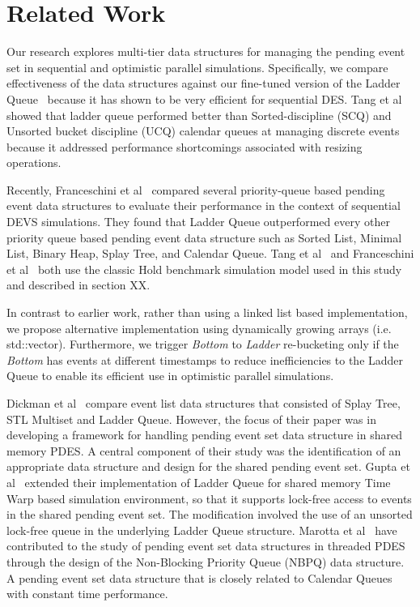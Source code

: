 \section{Related Work}
Our research explores multi-tier data structures for managing the pending event set in sequential and optimistic parallel simulations. Specifically, we compare effectiveness of the data structures against our fine-tuned version of the Ladder Queue~\cite{tang-05} because it has shown to be very efficient for sequential DES. Tang et al~\cite{tang-05} showed that ladder queue performed better than Sorted-discipline (SCQ) and Unsorted bucket discipline (UCQ) calendar queues at managing discrete events because it addressed performance shortcomings associated with resizing operations.  

Recently, Franceschini et al~\cite{franceschini-15} compared several priority-queue based pending event data structures to evaluate their performance in the context of sequential DEVS simulations. They found that Ladder Queue outperformed every other priority queue based pending event data structure such as Sorted List, Minimal List, Binary Heap, Splay Tree, and Calendar Queue. Tang et al~\cite{tang-05} and Franceschini et al~\cite{franceschini-15} both use the classic Hold benchmark simulation model used in this study and described in section XX.

In contrast to earlier work, rather than using a linked list based implementation, we propose alternative implementation using dynamically growing arrays (i.e. std::vector). Furthermore, we trigger \textit{Bottom} to \textit{Ladder} re-bucketing only if the \textit{Bottom} has events at different timestamps to reduce inefficiencies to the Ladder Queue to enable its efficient use in optimistic parallel simulations.

Dickman et al~\cite{dickman-13} compare event list data structures that consisted of Splay Tree, STL Multiset and Ladder Queue. However, the focus of their paper was in developing a framework for handling pending event set data structure in shared memory PDES. A central component of their study was the identification of an appropriate data structure and design for the shared pending event set. Gupta et al~\cite{gupta-14} extended their implementation of Ladder Queue for shared memory Time Warp based simulation environment, so that it supports lock-free access to events in the shared pending event set. The modification involved the use of an unsorted lock-free queue in the underlying Ladder Queue structure. Marotta et al~\cite{marotta-16} have contributed to the study of pending event set data structures in threaded PDES through the design of the Non-Blocking Priority Queue (NBPQ) data structure. A pending event set data structure that is closely related to Calendar Queues with constant time performance.

